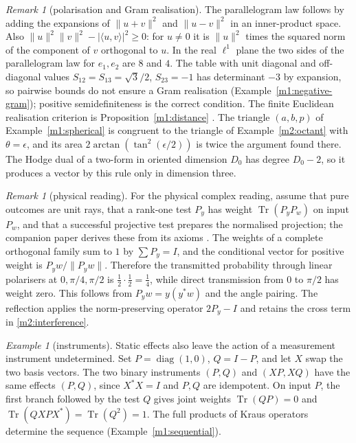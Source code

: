 \documentclass[11pt,reqno]{amsart}
\theoremstyle{definition}
\theoremstyle{remark}
\newtheorem{remark}[theorem]{Remark}
\newtheorem{example}[theorem]{Example}
\numberwithin{equation}{section}
\newcommand{\ip}[2]{\langle #1,#2\rangle}
\begin{document}
\begin{remark}[polarisation and Gram realisation]\label{m2:polarization}
The parallelogram law follows by adding the expansions of $\|u+v\|^2$ and $\|u-v\|^2$ in an inner-product space.  Also
$\|u\|^2\|v\|^2-|\ip uv|^2\ge0$: for $u\ne0$ it is $\|u\|^2$ times the squared norm of the component of $v$ orthogonal to $u$.  In the real
$\ell^1$ plane the two sides of the parallelogram law for $e_1,e_2$ are $8$ and $4$.  The table with unit diagonal and off-diagonal values
$S_{12}=S_{13}=\sqrt3/2$, $S_{23}=-1$ has determinant $-3$ by expansion, so pairwise bounds do not ensure a Gram realisation
(Example~\ref{m1:negative-gram}); positive semidefiniteness is the correct condition.  The finite Euclidean realisation criterion is
Proposition~\ref{m1:distance} \cite{m1:Schoenberg}.  The triangle $(a,b,p)$ of Example~\ref{m1:spherical} is congruent to
the triangle of Example~\ref{m2:octant} with $\theta=\epsilon$, and its area $2\arctan(\tan^2(\epsilon/2))$ is twice the argument found there.  The Hodge dual of a two-form in oriented
dimension $D_0$ has degree $D_0-2$, so it produces a vector by this rule only in dimension three.
\end{remark}

\begin{remark}[physical reading]\label{m2:reading-input}
For the physical complex reading, assume that pure outcomes are unit rays, that a rank-one test $P_y$ has weight
$\operatorname{Tr}(P_yP_w)$ on input $P_w$, and that a successful projective test prepares the normalised projection; the companion paper
derives these from its axioms \cite[Thms.~14 and~24]{Companion}.  The weights of a complete orthogonal family sum to $1$ by $\sum P_y=I$, and
the conditional vector for positive weight is $P_yw/\|P_yw\|$.  Therefore the transmitted probability through linear polarisers at
$0,\pi/4,\pi/2$ is $\tfrac12\cdot\tfrac12=\tfrac14$, while direct transmission from $0$ to $\pi/2$ has weight zero.  This follows from
$P_yw=y(y^*w)$ and the angle pairing.  The reflection applies the norm-preserving operator $2P_y-I$ and retains the cross term in
\eqref{m2:interference}.
\end{remark}

\begin{example}[instruments]\label{m2:instruments}
Static effects also leave the action of a measurement instrument undetermined.  Set $P=\operatorname{diag}(1,0)$, $Q=I-P$, and let $X$
swap the two basis vectors.  The two binary instruments $(P,Q)$ and $(XP,XQ)$ have the same effects $(P,Q)$, since $X^*X=I$ and $P,Q$ are
idempotent.  On input $P$, the first branch followed by the test $Q$ gives joint weights $\operatorname{Tr}(QP)=0$ and
$\operatorname{Tr}(QXPX^*)=\operatorname{Tr}(Q^2)=1$.  The full products of Kraus operators determine the sequence
(Example~\ref{m1:sequential}).
\end{example}
\end{document}
